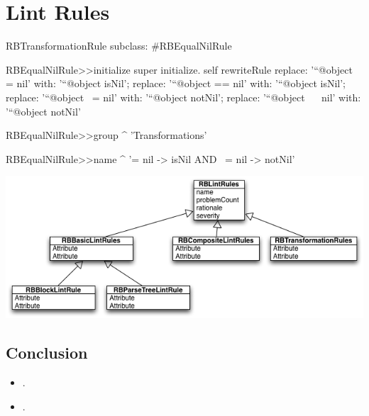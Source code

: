 \documentclass[a4paper,10pt,twoside]{book}
\begin{document}
\fi
\sloppy
\chapter{Lint Rules}

\begin{code}
RBTransformationRule subclass: #RBEqualNilRule

RBEqualNilRule>>initialize
	super initialize.
	self rewriteRule
		replace: '``@object = nil' with: '``@object isNil';
		replace: '``@object == nil' with: '``@object isNil';
		replace: '``@object ~= nil' with: '``@object notNil';
		replace: '``@object ~~ nil' with: '``@object notNil'

RBEqualNilRule>>group
	^ 'Transformations'

RBEqualNilRule>>name
	^ '= nil -> isNil AND ~= nil -> notNil'
\end{code}

\begin{center}\includegraphics[scale=0.4]{HierarchyRules}\end{center}




\section{Conclusion}

\begin{itemize}
\item . 
\item .
\end{itemize}

%
%


\ifx\wholebook\relax\else
   
   
\end{document}
